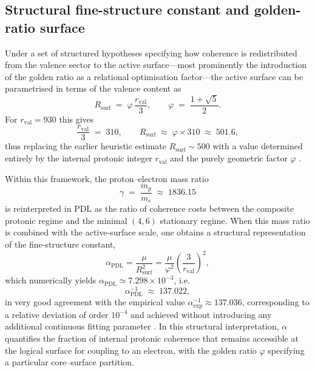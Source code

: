 \documentclass[11pt,a4paper]{article}
\numberwithin{equation}{section}
\begin{document}
\subsection{Structural fine-structure constant and golden-ratio surface}
\label{subsec:alpha_structural}

Under a set of structured hypotheses specifying how coherence is redistributed from the valence sector to the active surface—most prominently the introduction of the golden ratio as a relational optimisation factor—the active surface can be parametrised in terms of the valence content as \cite{LaubscherDerivationAlpha2026,LaubscherGoldenRatioPDL2026}
\begin{equation}
  R_{\mathrm{surf}} \;=\; \varphi\,\frac{r_{\mathrm{val}}}{3},
  \qquad
  \varphi \;=\; \frac{1+\sqrt{5}}{2}.
\end{equation}
For $r_{\mathrm{val}} = 930$ this gives
\begin{equation}
  \frac{r_{\mathrm{val}}}{3} \;=\; 310,
  \qquad
  R_{\mathrm{surf}} \;\approx\; \varphi \times 310 \;\approx\; 501.6,
\end{equation}
thus replacing the earlier heuristic estimate $R_{\mathrm{surf}}\sim 500$ with a value determined entirely by the internal protonic integer $r_{\mathrm{val}}$ and the purely geometric factor $\varphi$ \cite{LaubscherGoldenRatioPDL2026}.

Within this framework, the proton–electron mass ratio
\begin{equation}
  \gamma \;=\; \frac{m_p}{m_e} \;\approx\; 1836.15
\end{equation}
is reinterpreted in PDL as the ratio of coherence costs between the composite protonic regime and the minimal $(4,6)$ stationary regime. When this mass ratio is combined with the active-surface scale, one obtains a structural representation of the fine-structure constant,
\begin{equation}
  \alpha_{\text{PDL}}
    = \frac{\mu}{R_{\text{surf}}^2}
    = \frac{\mu}{\varphi^2}\left(\frac{3}{r_{\text{val}}}\right)^2,
\end{equation}
which numerically yields \(\alpha_{\text{PDL}} \simeq 7.298\times 10^{-3}\),
i.e.
\begin{equation}
  \alpha^{-1}_{\mathrm{PDL}} \;\approx\; 137.022,
\end{equation}
in very good agreement with the empirical value $\alpha^{-1}_{\mathrm{exp}}\approx 137.036$, corresponding to a relative deviation of order $10^{-4}$ and achieved without introducing any additional continuous fitting parameter \cite{LaubscherDerivationAlpha2026}. In this structural interpretation, $\alpha$ quantifies the fraction of internal protonic coherence that remains accessible at the logical surface for coupling to an electron, with the golden ratio $\varphi$ specifying a particular core–surface partition.
\end{document}
